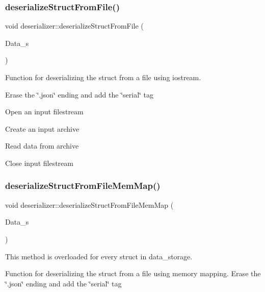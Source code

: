 \subsubsection{\texorpdfstring{deserialize\+Struct\+From\+File()}{deserializeStructFromFile()}\hspace{0.1cm}{\footnotesize\ttfamily [2/2]}}
{\footnotesize\ttfamily void deserializer\+::deserialize\+Struct\+From\+File (\begin{DoxyParamCaption}\item[{\hyperlink{structEXMPLE__s}{E\+X\+M\+P\+L\+E\+\_\+s} $\ast$}]{Data\+\_\+s }\end{DoxyParamCaption})}



Function for deserializing the struct from a file using iostream. 

Erase the \char`\"{}.\+json\char`\"{} ending and add the \char`\"{}serial\char`\"{} tag

Open an input filestream

Create an input archive

Read data from archive

Close input filestream \mbox{\label{classdeserializer_a5c34f1218c96b702dee10f34229c3253}} 
\subsubsection{\texorpdfstring{deserialize\+Struct\+From\+File\+Mem\+Map()}{deserializeStructFromFileMemMap()}\hspace{0.1cm}{\footnotesize\ttfamily [1/2]}}
{\footnotesize\ttfamily void deserializer\+::deserialize\+Struct\+From\+File\+Mem\+Map (\begin{DoxyParamCaption}\item[{\hyperlink{structUMGR__s}{U\+M\+G\+R\+\_\+s} $\ast$}]{Data\+\_\+s }\end{DoxyParamCaption})}



This method is overloaded for every struct in data\+\_\+storage. 

Function for deserializing the struct from a file using memory mapping. Erase the \char`\"{}.\+json\char`\"{} ending and add the \char`\"{}serial\char`\"{} tag

